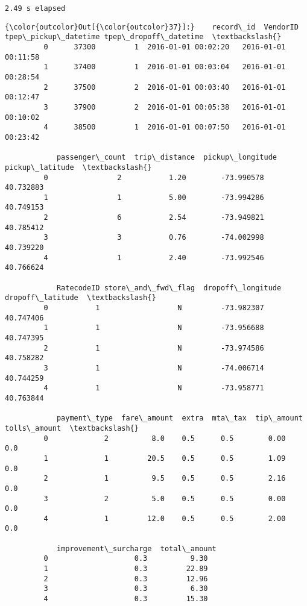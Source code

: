 \documentclass[11pt]{article}
\begin{document}
    \begin{Verbatim}[commandchars=\\\{\}]
2.49 s elapsed

    \end{Verbatim}

\begin{Verbatim}[commandchars=\\\{\}]
{\color{outcolor}Out[{\color{outcolor}37}]:}    record\_id  VendorID tpep\_pickup\_datetime tpep\_dropoff\_datetime  \textbackslash{}
         0      37300         1  2016-01-01 00:02:20   2016-01-01 00:11:58   
         1      37400         1  2016-01-01 00:03:04   2016-01-01 00:28:54   
         2      37500         2  2016-01-01 00:03:40   2016-01-01 00:12:47   
         3      37900         2  2016-01-01 00:05:38   2016-01-01 00:10:02   
         4      38500         1  2016-01-01 00:07:50   2016-01-01 00:23:42   
         
            passenger\_count  trip\_distance  pickup\_longitude  pickup\_latitude  \textbackslash{}
         0                2           1.20        -73.990578        40.732883   
         1                1           5.00        -73.994286        40.749153   
         2                6           2.54        -73.949821        40.785412   
         3                3           0.76        -74.002998        40.739220   
         4                1           2.40        -73.992546        40.766624   
         
            RatecodeID store\_and\_fwd\_flag  dropoff\_longitude  dropoff\_latitude  \textbackslash{}
         0           1                  N         -73.982307         40.747406   
         1           1                  N         -73.956688         40.747395   
         2           1                  N         -73.974586         40.758282   
         3           1                  N         -74.006714         40.744259   
         4           1                  N         -73.958771         40.763844   
         
            payment\_type  fare\_amount  extra  mta\_tax  tip\_amount  tolls\_amount  \textbackslash{}
         0             2          8.0    0.5      0.5        0.00           0.0   
         1             1         20.5    0.5      0.5        1.09           0.0   
         2             1          9.5    0.5      0.5        2.16           0.0   
         3             2          5.0    0.5      0.5        0.00           0.0   
         4             1         12.0    0.5      0.5        2.00           0.0   
         
            improvement\_surcharge  total\_amount  
         0                    0.3          9.30  
         1                    0.3         22.89  
         2                    0.3         12.96  
         3                    0.3          6.30  
         4                    0.3         15.30  
\end{Verbatim}
            
\end{document}
